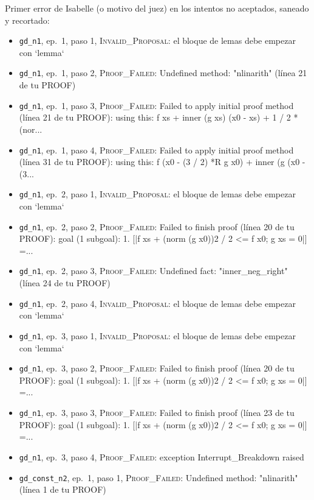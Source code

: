 \documentclass[11pt,a4paper]{article}
\begin{document}
{\raggedright\sloppy Primer error de Isabelle (o motivo del juez) en los intentos no aceptados, saneado y recortado:
\begin{itemize}
  \item \texttt{gd\_\allowbreak{}n1}, ep.~1, paso 1, \textsc{Invalid\_Proposal}: el bloque de lemas debe empezar con `lemma`
  \item \texttt{gd\_\allowbreak{}n1}, ep.~1, paso 2, \textsc{Proof\_Failed}: Undefined method: "nlinarith" (línea 21 de tu PROOF)
  \item \texttt{gd\_\allowbreak{}n1}, ep.~1, paso 3, \textsc{Proof\_Failed}: Failed to apply initial proof method (línea 21 de tu PROOF): using this: f xs + inner (g xs) (x0 - xs) + 1 / 2 * (nor...
  \item \texttt{gd\_\allowbreak{}n1}, ep.~1, paso 4, \textsc{Proof\_Failed}: Failed to apply initial proof method (línea 31 de tu PROOF): using this: f (x0 - (3 / 2) *R g x0) + inner (g (x0 - (3...
  \item \texttt{gd\_\allowbreak{}n1}, ep.~2, paso 1, \textsc{Invalid\_Proposal}: el bloque de lemas debe empezar con `lemma`
  \item \texttt{gd\_\allowbreak{}n1}, ep.~2, paso 2, \textsc{Proof\_Failed}: Failed to finish proof (línea 20 de tu PROOF): goal (1 subgoal): 1. [|f xs + (norm (g x0))2 / 2 <= f x0; g xs = 0|] =...
  \item \texttt{gd\_\allowbreak{}n1}, ep.~2, paso 3, \textsc{Proof\_Failed}: Undefined fact: "inner\_neg\_right" (línea 24 de tu PROOF)
  \item \texttt{gd\_\allowbreak{}n1}, ep.~2, paso 4, \textsc{Invalid\_Proposal}: el bloque de lemas debe empezar con `lemma`
  \item \texttt{gd\_\allowbreak{}n1}, ep.~3, paso 1, \textsc{Invalid\_Proposal}: el bloque de lemas debe empezar con `lemma`
  \item \texttt{gd\_\allowbreak{}n1}, ep.~3, paso 2, \textsc{Proof\_Failed}: Failed to finish proof (línea 20 de tu PROOF): goal (1 subgoal): 1. [|f xs + (norm (g x0))2 / 2 <= f x0; g xs = 0|] =...
  \item \texttt{gd\_\allowbreak{}n1}, ep.~3, paso 3, \textsc{Proof\_Failed}: Failed to finish proof (línea 23 de tu PROOF): goal (1 subgoal): 1. [|f xs + (norm (g x0))2 / 2 <= f x0; g xs = 0|] =...
  \item \texttt{gd\_\allowbreak{}n1}, ep.~3, paso 4, \textsc{Proof\_Failed}: exception Interrupt\_Breakdown raised
  \item \texttt{gd\_\allowbreak{}const\_\allowbreak{}n2}, ep.~1, paso 1, \textsc{Proof\_Failed}: Undefined method: "nlinarith" (línea 1 de tu PROOF)

\end{itemize}}
\end{document}
